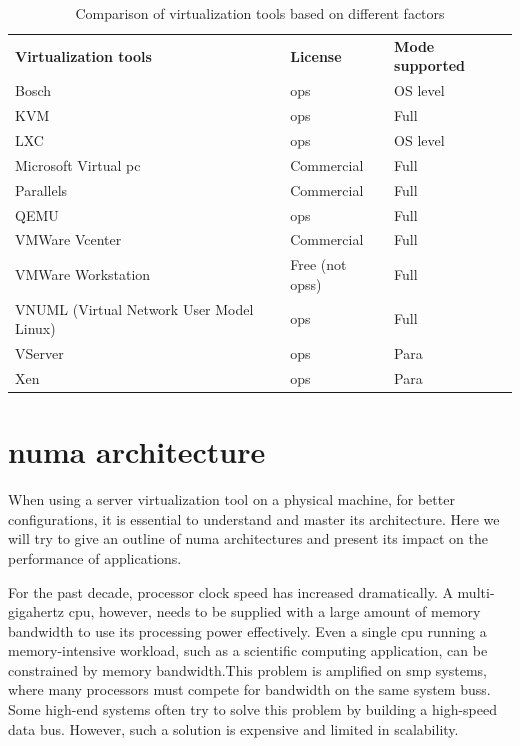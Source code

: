 \begin{table}[!h]
    \centering
    \caption{Comparison of virtualization tools based on different factors}
    \begin{tabular}{p{5cm}>{\centering\arraybackslash}p{4cm}>{\centering\arraybackslash}p{4cm}}
     \toprule
     \textbf{Virtualization tools} & \textbf{License} & \textbf{Mode supported} \\
     \myrowcolour
     Bosch &  \gls{ops} & OS level \\
     KVM & \gls{ops} & Full \\
     \myrowcolour
     LXC & \gls{ops} & OS level \\
     Microsoft Virtual \acrshort{pc} & Commercial & Full \\
     \myrowcolour
     Parallels & Commercial & Full \\
     QEMU & \gls{ops} & Full \\
     \myrowcolour
     VMWare Vcenter & Commercial & Full \\
     VMWare Workstation & Free (not \glspl{ops}) & Full \\
     \myrowcolour
     VNUML (Virtual Network User Model Linux) & \gls{ops} & Full \\
     VServer & \gls{ops} & Para \\
     \myrowcolour
     Xen & \gls{ops} & Para \\
 
     \bottomrule
    \end{tabular}
    \label{table:virtualtools}
\end{table}

\section{\acrshort{numa} architecture}
 When using a server virtualization tool on a physical machine, for better configurations, it is essential to understand and master its architecture. Here we will try to give an outline of \acrshort{numa} architectures and present its impact on the performance of applications.
 
\par For the past decade, processor clock speed has increased dramatically. A multi-gigahertz \acrshort{cpu}, however, needs to be supplied with a large amount of memory bandwidth to use its processing power effectively. Even a single \acrshort{cpu} running a memory-intensive workload, such as a scientific computing application, can be constrained by memory bandwidth.This problem is amplified on \acrshort{smp} systems, where many processors must compete for bandwidth on the same system \glspl{bus}. Some high-end systems often try to solve this problem by building a high-speed data bus. However, such a solution is expensive and limited in scalability.

